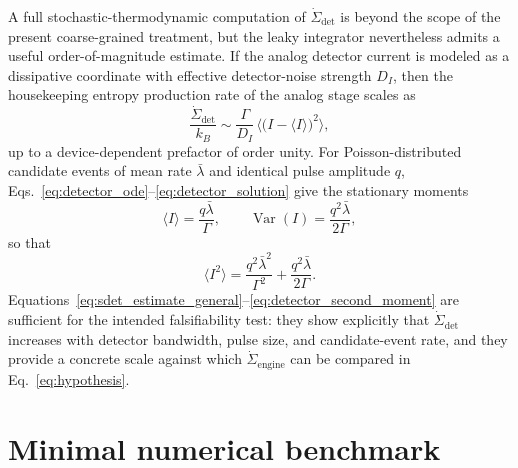 \documentclass[aps,pre,reprint,amsmath,amssymb,floatfix,nofootinbib]{revtex4-2}
\newcommand{\avg}[1]{\langle #1 \rangle}
\newcommand{\Sdot}{\dot{\Sigma}}
\begin{document}
A full stochastic-thermodynamic computation of $\Sdot_{\mathrm{det}}$ is
beyond the scope of the present coarse-grained treatment, but the leaky
integrator nevertheless admits a useful order-of-magnitude estimate. If the
analog detector current is modeled as a dissipative coordinate with
effective detector-noise strength $D_I$, then the housekeeping entropy
production rate of the analog stage scales as
\begin{equation}
  \frac{\Sdot_{\mathrm{det}}}{k_B}
  \sim
  \frac{\Gamma}{D_I}\,\avg{\big(I-\avg{I}\big)^2},
  \label{eq:sdet_estimate_general}
\end{equation}
up to a device-dependent prefactor of order unity. For Poisson-distributed
candidate events of mean rate $\bar\lambda$ and identical pulse amplitude
$q$, Eqs.~\eqref{eq:detector_ode}--\eqref{eq:detector_solution} give the
stationary moments
\begin{equation}
  \avg{I}=\frac{q\bar\lambda}{\Gamma},
  \qquad
  \operatorname{Var}(I)=\frac{q^2\bar\lambda}{2\Gamma},
  \label{eq:detector_moments}
\end{equation}
so that
\begin{equation}
  \avg{I^2}=
  \frac{q^2\bar\lambda^2}{\Gamma^2}
  +
  \frac{q^2\bar\lambda}{2\Gamma}.
  \label{eq:detector_second_moment}
\end{equation}
Equations~\eqref{eq:sdet_estimate_general}--\eqref{eq:detector_second_moment}
are sufficient for the intended falsifiability test: they show explicitly
that $\Sdot_{\mathrm{det}}$ increases with detector bandwidth, pulse size,
and candidate-event rate, and they provide a concrete scale against which
$\Sdot_{\mathrm{engine}}$ can be compared in Eq.~\eqref{eq:hypothesis}.

\section{Minimal numerical benchmark}
\label{sec:numerics}
\end{document}
